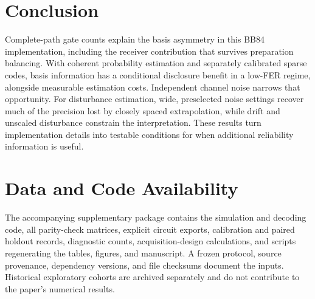 \section{Conclusion}
Complete-path gate counts explain the basis asymmetry in this BB84 implementation, including
the receiver contribution that survives preparation balancing. With coherent probability
estimation and separately calibrated sparse codes, basis information has a conditional
disclosure benefit in a low-FER regime, alongside measurable estimation costs. Independent
channel noise narrows that opportunity. For disturbance estimation, wide, preselected noise
settings recover much of the precision lost by closely spaced extrapolation, while drift
and unscaled disturbance constrain the interpretation. These results turn implementation
details into testable conditions for when additional reliability information is useful.

\section*{Data and Code Availability}
The accompanying supplementary package contains the simulation and decoding code, all
parity-check matrices, explicit circuit exports, calibration and paired holdout records,
diagnostic counts, acquisition-design calculations, and scripts regenerating the tables,
figures, and manuscript. A frozen protocol, source provenance, dependency versions, and
file checksums document the inputs. Historical exploratory cohorts are archived separately
and do not contribute to the paper's numerical results.

\FloatBarrier


\FloatBarrier



